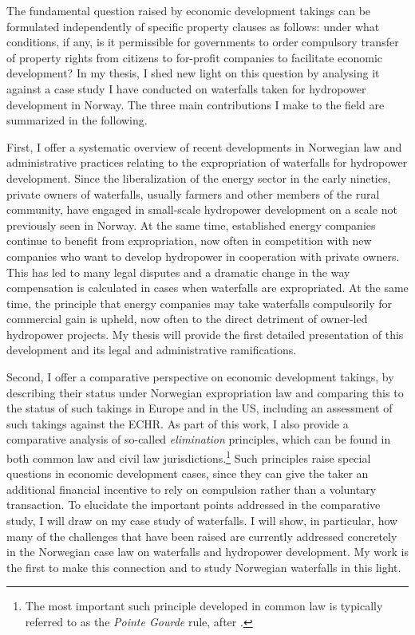 \documentclass[12pt,a4paper]{article} %
\begin{document}
The fundamental question raised by economic development takings can be formulated independently of specific property clauses as follows: under what conditions, if any, is it permissible for governments to order compulsory transfer of property rights from citizens to for-profit companies to facilitate economic development? In my thesis, I shed new light on this question by analysing it against a case study I have conducted on waterfalls taken for hydropower development in Norway. The three main contributions I make to the field are summarized in the following.

First, I offer a systematic overview of recent developments in Norwegian law and administrative practices relating to the expropriation of waterfalls for hydropower development. Since the liberalization of the energy sector in the early nineties, private owners of waterfalls, usually farmers and other members of the rural community, have engaged in small-scale hydropower development on a scale not previously seen in Norway. At the same time, established energy companies continue to benefit from expropriation, now often in competition with new companies who want to develop hydropower in cooperation with private owners. This has led to many legal disputes and a dramatic change in the way compensation is calculated in cases when waterfalls are expropriated. At the same time, the principle that energy companies may take waterfalls compulsorily for commercial gain is upheld, now often to the direct detriment of owner-led hydropower projects. My thesis will provide the first detailed presentation of this development and its legal and administrative ramifications.

Second, I offer a comparative perspective on economic development takings, by describing their status under Norwegian expropriation law and comparing this to the status of such takings in Europe and in the US, including an assessment of such takings against the ECHR. As part of this work, I also provide a comparative analysis of so-called {\it elimination} principles, which can be found in both common law and civil law jurisdictions.\footnote{The most important such principle developed in common law is typically referred to as the {\it Pointe Gourde} rule, after \cite{gourdexx}.} Such principles raise special questions in economic development cases, since they can give the taker an additional financial incentive to rely on compulsion rather than a voluntary transaction. To elucidate the important points addressed in the comparative study, I will draw on my case study of waterfalls. I will show, in particular, how many of the challenges that have been raised are currently addressed concretely in the Norwegian case law on waterfalls and hydropower development. My work is the first to make this connection and to study Norwegian waterfalls in this light.
\end{document}
